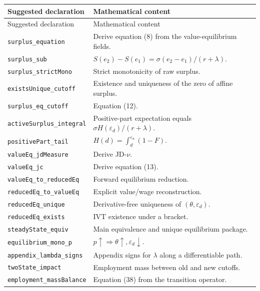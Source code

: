 \documentclass[11pt]{article}
\newcommand{\epsd}{\varepsilon_d}
\newcommand{\epsu}{\varepsilon_u}
\newcommand{\leanname}[1]{\texttt{#1}}
\begin{document}
\small
\begin{longtable}{>{\raggedright\arraybackslash}p{} >{\raggedright\arraybackslash}p{}}
\toprule
Suggested declaration & Mathematical content \\
\midrule
\endfirsthead
\toprule
Suggested declaration & Mathematical content \\
\midrule
\endhead
\leanname{surplus\_equation} & Derive equation (8) from the value-equilibrium fields. \\
\leanname{surplus\_sub} & $S(e_2)-S(e_1)=\sigma(e_2-e_1)/(r+\lambda)$. \\
\leanname{surplus\_strictMono} & Strict monotonicity of raw surplus. \\
\leanname{existsUnique\_cutoff} & Existence and uniqueness of the zero of affine surplus. \\
\leanname{surplus\_eq\_cutoff} & Equation (12). \\
\leanname{activeSurplus\_integral} & Positive-part expectation equals $\sigma H(\epsd)/(r+\lambda)$. \\
\leanname{positivePart\_tail} & $H(d)=\int_d^{\epsu}(1-F)$. \\
\leanname{valueEq\_jdMeasure} & Derive JD-$\nu$. \\
\leanname{valueEq\_jc} & Derive equation (13). \\
\leanname{valueEq\_to\_reducedEq} & Forward equilibrium reduction. \\
\leanname{reducedEq\_to\_valueEq} & Explicit value/wage reconstruction. \\
\leanname{reducedEq\_unique} & Derivative-free uniqueness of $(\theta,\epsd)$. \\
\leanname{reducedEq\_exists} & IVT existence under a bracket. \\
\leanname{steadyState\_equiv} & Main equivalence and unique equilibrium package. \\
\leanname{equilibrium\_mono\_p} & $p\uparrow\Rightarrow\theta\uparrow,\epsd\downarrow$. \\
\leanname{appendix\_lambda\_signs} & Appendix signs for $\lambda$ along a differentiable path. \\
\leanname{twoState\_impact} & Employment mass between old and new cutoffs. \\
\leanname{employment\_massBalance} & Equation (38) from the transition operator. \\
\bottomrule
\end{longtable}
\normalsize
\end{document}

